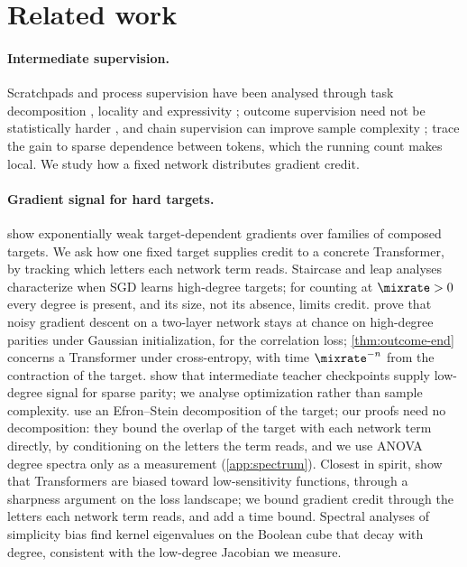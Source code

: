 \section{Related work}
\label{sec:related}

\paragraph{Intermediate supervision.} Scratchpads and process supervision
\citep{nye2021scratchpads,uesato2022solving,wei2022cot,lightman2023verify} have been analysed through task decomposition
\citep{wies2023subtask}, locality \citep{prystawski2023think,abbe2024globality} and expressivity
\citep{feng2023towards,merrill2024expressive,malach2023autoregressive}; outcome supervision need not be statistically
harder \citep{jia2025verify}, and chain supervision can improve sample complexity
\citep{hanneke2026samplecomplexityautoregressivereasoning,wen2024sparse}; \citet{wen2024sparse} trace the gain to sparse
dependence between tokens, which the running count makes local. We study how a fixed network distributes gradient credit.

\paragraph{Gradient signal for hard targets.} \citet{shalevshwartz2017failures} show exponentially weak target-dependent
gradients over families of composed targets. We ask how one fixed target supplies credit to a concrete Transformer, by tracking
which letters each network term reads. Staircase and leap analyses \citep{abbe2021staircase,abbe2022mergedstaircase,abbe2023sgd} characterize when SGD
learns high-degree targets; for counting at $\mixrate>0$ every degree is present, and its size, not its absence, limits
credit. \citet{abbe2025parities} prove that noisy gradient descent on a two-layer network stays at chance on high-degree
parities under Gaussian initialization, for the correlation loss; \cref{thm:outcome-end} concerns a Transformer under
cross-entropy, with time $\mixrate^{-n}$ from the contraction of the target. \citet{panigrahi2025progressive} show that
intermediate teacher checkpoints supply low-degree signal for sparse parity; we analyse optimization rather than sample
complexity. \citet{li2025noise} use an Efron--Stein decomposition of the target; our proofs need no decomposition: they bound the
overlap of the target with each network term directly, by conditioning on the letters the term reads, and we use ANOVA degree spectra
only as a measurement (\cref{app:spectrum}). Closest in spirit,
\citet{hahn2024sensitive} show that Transformers are biased toward low-sensitivity functions, through a sharpness argument on
the loss landscape; we bound gradient credit through the letters each network term reads, and add a time bound. Spectral analyses of simplicity bias \citep{yang2019spectral} find kernel eigenvalues on the Boolean cube that
decay with degree, consistent with the low-degree Jacobian we measure.

